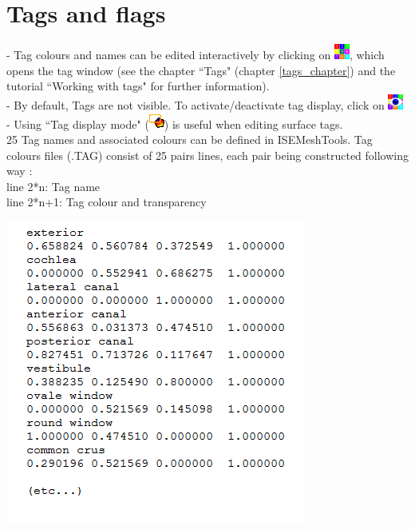 \section{Tags and flags}

\begin{minipage}{0.55\textwidth}
- Tag colours and names can be edited interactively by
clicking on \includegraphics[scale=0.7]{images/pixmap/Show_Tag_Window2.png}, which opens the tag window (see the chapter
``Tags" (chapter \ref{tags_chapter}) and the tutorial ``Working with tags" for
further information).\\
- By default, Tags are not visible. To activate/deactivate tag
display, click on \includegraphics[scale=0.7]{images/pixmap/Show_Tag_Window.png}\\
- Using ``Tag display mode" (\includegraphics[scale=0.7]{images/pixmap/Tag_select_mode.png}) is useful when editing
surface tags.\\
25 Tag names and associated colours can be defined in ISEMeshTools.
Tag colours files (.TAG) consist of 25 pairs lines,
each pair being constructed following way :\\
line 2*n: Tag name\\
line 2*n+1: Tag colour and transparency
\end{minipage}  
 \begin{minipage}{0.45\textwidth}\centering
  \includegraphics[scale=0.5]{images/Icons/Tags.png}
 \end{minipage} 

